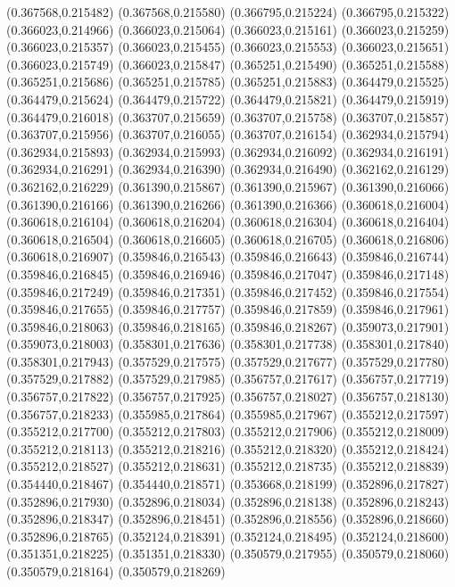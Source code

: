 (0.367568,0.215482)
(0.367568,0.215580)
(0.366795,0.215224)
(0.366795,0.215322)
(0.366023,0.214966)
(0.366023,0.215064)
(0.366023,0.215161)
(0.366023,0.215259)
(0.366023,0.215357)
(0.366023,0.215455)
(0.366023,0.215553)
(0.366023,0.215651)
(0.366023,0.215749)
(0.366023,0.215847)
(0.365251,0.215490)
(0.365251,0.215588)
(0.365251,0.215686)
(0.365251,0.215785)
(0.365251,0.215883)
(0.364479,0.215525)
(0.364479,0.215624)
(0.364479,0.215722)
(0.364479,0.215821)
(0.364479,0.215919)
(0.364479,0.216018)
(0.363707,0.215659)
(0.363707,0.215758)
(0.363707,0.215857)
(0.363707,0.215956)
(0.363707,0.216055)
(0.363707,0.216154)
(0.362934,0.215794)
(0.362934,0.215893)
(0.362934,0.215993)
(0.362934,0.216092)
(0.362934,0.216191)
(0.362934,0.216291)
(0.362934,0.216390)
(0.362934,0.216490)
(0.362162,0.216129)
(0.362162,0.216229)
(0.361390,0.215867)
(0.361390,0.215967)
(0.361390,0.216066)
(0.361390,0.216166)
(0.361390,0.216266)
(0.361390,0.216366)
(0.360618,0.216004)
(0.360618,0.216104)
(0.360618,0.216204)
(0.360618,0.216304)
(0.360618,0.216404)
(0.360618,0.216504)
(0.360618,0.216605)
(0.360618,0.216705)
(0.360618,0.216806)
(0.360618,0.216907)
(0.359846,0.216543)
(0.359846,0.216643)
(0.359846,0.216744)
(0.359846,0.216845)
(0.359846,0.216946)
(0.359846,0.217047)
(0.359846,0.217148)
(0.359846,0.217249)
(0.359846,0.217351)
(0.359846,0.217452)
(0.359846,0.217554)
(0.359846,0.217655)
(0.359846,0.217757)
(0.359846,0.217859)
(0.359846,0.217961)
(0.359846,0.218063)
(0.359846,0.218165)
(0.359846,0.218267)
(0.359073,0.217901)
(0.359073,0.218003)
(0.358301,0.217636)
(0.358301,0.217738)
(0.358301,0.217840)
(0.358301,0.217943)
(0.357529,0.217575)
(0.357529,0.217677)
(0.357529,0.217780)
(0.357529,0.217882)
(0.357529,0.217985)
(0.356757,0.217617)
(0.356757,0.217719)
(0.356757,0.217822)
(0.356757,0.217925)
(0.356757,0.218027)
(0.356757,0.218130)
(0.356757,0.218233)
(0.355985,0.217864)
(0.355985,0.217967)
(0.355212,0.217597)
(0.355212,0.217700)
(0.355212,0.217803)
(0.355212,0.217906)
(0.355212,0.218009)
(0.355212,0.218113)
(0.355212,0.218216)
(0.355212,0.218320)
(0.355212,0.218424)
(0.355212,0.218527)
(0.355212,0.218631)
(0.355212,0.218735)
(0.355212,0.218839)
(0.354440,0.218467)
(0.354440,0.218571)
(0.353668,0.218199)
(0.352896,0.217827)
(0.352896,0.217930)
(0.352896,0.218034)
(0.352896,0.218138)
(0.352896,0.218243)
(0.352896,0.218347)
(0.352896,0.218451)
(0.352896,0.218556)
(0.352896,0.218660)
(0.352896,0.218765)
(0.352124,0.218391)
(0.352124,0.218495)
(0.352124,0.218600)
(0.351351,0.218225)
(0.351351,0.218330)
(0.350579,0.217955)
(0.350579,0.218060)
(0.350579,0.218164)
(0.350579,0.218269)
